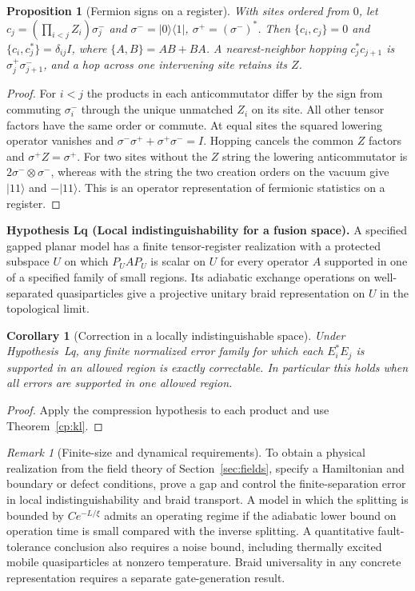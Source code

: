 \documentclass[aps,pra,onecolumn,superscriptaddress,nofootinbib,10pt]{revtex4-2}
\newtheorem{proposition}[theorem]{Proposition}
\newtheorem{corollary}[theorem]{Corollary}
\theoremstyle{definition}
\theoremstyle{remark}
\newtheorem{remark}[theorem]{Remark}
\begin{document}
\begin{proposition}[Fermion signs on a register]\label{cp:jw}
With sites ordered from $0$, let $c_j=(\prod_{i<j}Z_i)\sigma^-_j$ and $\sigma^-=|0\rangle\langle1|$, $\sigma^+=(\sigma^-)^*$. Then $\{c_i,c_j\}=0$ and $\{c_i,c_j^*\}=\delta_{ij}I$, where $\{A,B\}=AB+BA$. A nearest-neighbor hopping $c_j^*c_{j+1}$ is $\sigma^+_j\sigma^-_{j+1}$, and a hop across one intervening site retains its $Z$. \cite{n5-jw-ref}
\end{proposition}
\begin{proof}
For $i<j$ the products in each anticommutator differ by the sign from commuting $\sigma^-_i$ through the unique unmatched $Z_i$ on its site. All other tensor factors have the same order or commute. At equal sites the squared lowering operator vanishes and $\sigma^-\sigma^++\sigma^+\sigma^-=I$. Hopping cancels the common $Z$ factors and $\sigma^+Z=\sigma^+$. For two sites without the $Z$ string the lowering anticommutator is $2\sigma^-\otimes\sigma^-$, whereas with the string the two creation orders on the vacuum give $|11\rangle$ and $-|11\rangle$. This is an operator representation of fermionic statistics on a register.
\end{proof}

\smallskip\noindent\textbf{Hypothesis Lq (Local indistinguishability for a fusion space).}\label{hyp:Lq}  A specified gapped planar model has a finite tensor-register realization with a protected subspace $U$ on which $P_U A P_U$ is scalar on $U$ for every operator $A$ supported in one of a specified family of small regions. Its adiabatic exchange operations on well-separated quasiparticles give a projective unitary braid representation on $U$ in the topological limit. \cite{n4:Nayak,n5-kitaev}


\begin{corollary}[Correction in a locally indistinguishable space]\label{cp:anyoncode}
Under Hypothesis~Lq, any finite normalized error family for which each $E_i^*E_j$ is supported in an allowed region is exactly correctable. In particular this holds when all errors are supported in one allowed region.
\end{corollary}
\begin{proof}
Apply the compression hypothesis to each product and use Theorem~\ref{cp:kl}.
\end{proof}

\begin{remark}[Finite-size and dynamical requirements]\label{cp:anyonprogramme}
To obtain a physical realization from the field theory of Section~\ref{sec:fields}, specify a Hamiltonian and boundary or defect conditions, prove a gap and control the finite-separation error in local indistinguishability and braid transport. A model in which the splitting is bounded by $C e^{-L/\xi}$ admits an operating regime if the adiabatic lower bound on operation time is small compared with the inverse splitting. A quantitative fault-tolerance conclusion also requires a noise bound, including thermally excited mobile quasiparticles at nonzero temperature. Braid universality in any concrete representation requires a separate gate-generation result. \cite{n4:Nayak}
\end{remark}
\end{document}
